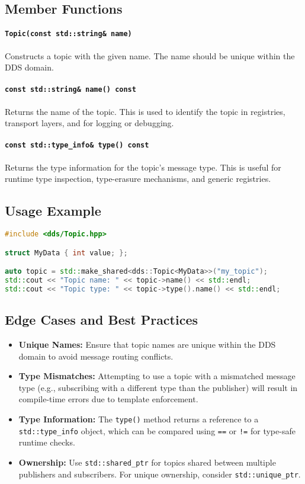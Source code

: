 \documentclass[12pt]{report}
\begin{document}
\subsection{Member Functions}
\paragraph{\texttt{Topic(const std::string\& name)}}
Constructs a topic with the given name. The name should be unique within the DDS domain.

\paragraph{\texttt{const std::string\& name() const}}
Returns the name of the topic. This is used to identify the topic in registries, transport layers, and for logging or debugging.

\paragraph{\texttt{const std::type\_info\& type() const}}
Returns the type information for the topic's message type. This is useful for runtime type inspection, type-erasure mechanisms, and generic registries.

\subsection{Usage Example}
\begin{lstlisting}[language=C++]
#include <dds/Topic.hpp>

struct MyData { int value; };

auto topic = std::make_shared<dds::Topic<MyData>>("my_topic");
std::cout << "Topic name: " << topic->name() << std::endl;
std::cout << "Topic type: " << topic->type().name() << std::endl;
\end{lstlisting}

\subsection{Edge Cases and Best Practices}
\begin{itemize}
    \item \textbf{Unique Names:} Ensure that topic names are unique within the DDS domain to avoid message routing conflicts.
    \item \textbf{Type Mismatches:} Attempting to use a topic with a mismatched message type (e.g., subscribing with a different type than the publisher) will result in compile-time errors due to template enforcement.
    \item \textbf{Type Information:} The \texttt{type()} method returns a reference to a \texttt{std::type\_info} object, which can be compared using \texttt{==} or \texttt{!=} for type-safe runtime checks.
    \item \textbf{Ownership:} Use \texttt{std::shared\_ptr} for topics shared between multiple publishers and subscribers. For unique ownership, consider \texttt{std::unique\_ptr}.
\end{itemize}
\end{document}
